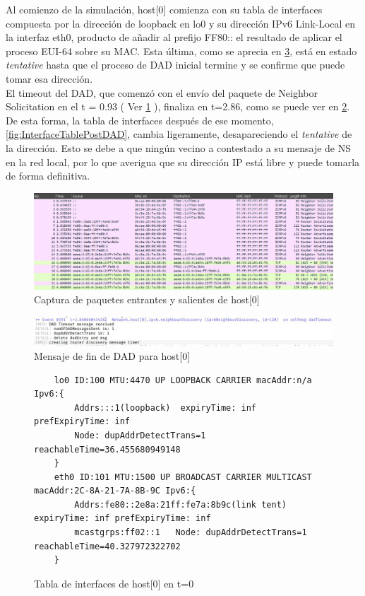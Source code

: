 Al comienzo de la simulación, host[0] comienza con su tabla de interfaces compuesta por la dirección de loopback en lo0 y su dirección IPv6 Link-Local en la interfaz eth0, producto de añadir al prefijo FF80:: el resultado de aplicar el proceso EUI-64 sobre su MAC. Esta última, como se aprecia en \ref{fig:InterfaceTableInicial}, está en estado \textit{tentative} hasta que el proceso de DAD inicial termine y se confirme que puede tomar esa dirección. \\
El timeout del DAD, que comenzó con el envío del paquete de Neighbor Solicitation en el t = 0.93 ( Ver \ref{fig:paquetes_IPv6_host0} ), finaliza en t=2.86, como se puede ver en \ref{fig:DAD_host0}. \\
De esta forma, la tabla de interfaces después de ese momento, \ref{fig:InterfaceTablePostDAD}, cambia ligeramente, desapareciendo el \textit{tentative} de la dirección. Esto se debe a que ningún vecino a contestado a su mensaje de NS en la red local, por lo que averigua que su dirección IP está libre y puede tomarla de forma definitiva.

\begin{figure}[H]
    \centering
    \includegraphics[width=135mm, scale=0.75]{imaxes/ejercicio2_4_1.png}
    \caption{Captura de paquetes entrantes y salientes de host[0]}
    \label{fig:paquetes_IPv6_host0}
\end{figure}

\begin{figure}[H]
    \centering
    \includegraphics[width=135mm, scale=0.75]{imaxes/ejercicio2_4_2.png}
    \caption{Mensaje de fin de DAD para host[0]}
    \label{fig:DAD_host0}
\end{figure}

\begin{figure}[H]
    \centering
    \begin{lstlisting}
    lo0 ID:100 MTU:4470 UP LOOPBACK CARRIER macAddr:n/a Ipv6:{
        Addrs:::1(loopback)  expiryTime: inf prefExpiryTime: inf
        Node: dupAddrDetectTrans=1 reachableTime=36.455680949148
    }
    eth0 ID:101 MTU:1500 UP BROADCAST CARRIER MULTICAST macAddr:2C-8A-21-7A-8B-9C Ipv6:{
        Addrs:fe80::2e8a:21ff:fe7a:8b9c(link tent)  expiryTime: inf prefExpiryTime: inf
        mcastgrps:ff02::1 	Node: dupAddrDetectTrans=1 reachableTime=40.327972322702
    }
    \end{lstlisting}
    \caption{Tabla de interfaces de host[0] en t=0}
    \label{fig:InterfaceTableInicial}
\end{figure}

